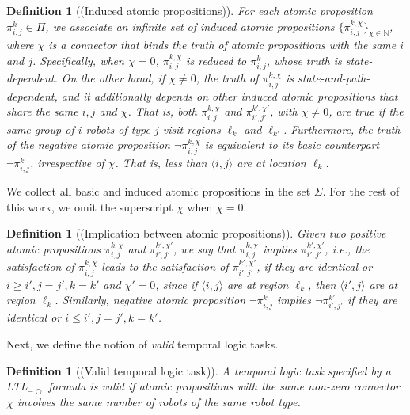 \documentclass[Afour,sageh,times]{sagej}
\newtheorem{defn}[thm]{Definition}
\newcommand{\ltl}{ {\it LTL}$_{-\bigcirc}$ }
\newcommand{\ag}[2]{\langle#1,#2\rangle}
\newcommand{\simplies}{\DOTSB\Longrightarrow}
\renewcommand{\ap}[3]{\mathcal{\pi}_{{#1},{#2}}^{#3}}
\begin{document}
\begin{defn}[(Induced atomic propositions)]
   For each atomic proposition $\ap{i}{j}{k} \in \Pi$, we associate an infinite set of  {induced} atomic propositions $\{\ap{i}{j}{k,\chi}\}_{\chi\in \mathbb{N}}$, where $\chi$ is a {\it connector} that binds the truth of  atomic propositions with the same $i$ and $j$. Specifically, when $\chi=0$, $\ap{i}{j}{k,\chi}$ is reduced to $\ap{i}{j}{k}$, whose truth is state-dependent. On the other hand, if $\chi \neq 0$, the truth of $\ap{i}{j}{k,\chi}$ is state-and-path-dependent, and it additionally depends on other induced atomic propositions that share the same $i,j$ and $\chi$. That is, both $\ap{i}{j}{k,\chi}$ and $\ap{i'}{j'}{k',\chi'}$, with $\chi\not=0$, are true if the same group of $i$ robots of type $j$ visit regions $\ell_k$ and $\ell_{k'}$. Furthermore, the truth of the negative atomic proposition  $\neg \ap{i}{j}{k,\chi}$ is equivalent to its basic counterpart $\neg \ap{i}{j}{k}$, irrespective of  $\chi$. That is, less than $\ag{i}{j}$ are at location $\ell_k$.
\end{defn}
We collect all basic and induced atomic propositions in the set $\Sigma$.  For the rest of this work, we omit the superscript $\chi$ when $\chi=0$.
\begin{defn}[(Implication between atomic propositions)]\label{defn:literalimplication}
  Given two positive atomic propositions $\ap{i}{j}{k,\chi}$ and $\ap{i'}{j'}{k',\chi'}$, we say that $\ap{i}{j}{k,\chi}$ implies $\ap{i'}{j'}{k',\chi'}$, i.e., the satisfaction of $\ap{i}{j}{k,\chi}$ leads to the satisfaction of $\ap{i'}{j'}{k',\chi'}$,
  if they are identical or $i\geq i', j= j', k=k'$ and $\chi'=0$,  since if $\ag{i}{j}$ are at region $\ell_k$, then $\ag{i'}{j}$ are at region $\ell_k$.   Similarly, negative atomic proposition $\neg \ap{i}{j}{k}$ implies $\neg \ap{i'}{j'}{k'}$ if they are identical or $i\leq i', j= j', k=k'$.
\end{defn}

 Next, we define the notion of {\it valid} temporal logic tasks.
 \begin{defn}[(Valid temporal logic task)]\label{defn:valid}
A temporal logic task specified by a\ltl formula is valid if atomic propositions with the same non-zero connector $\chi$ involves the same number of robots of the same robot type.
 \end{defn}
\end{document}
